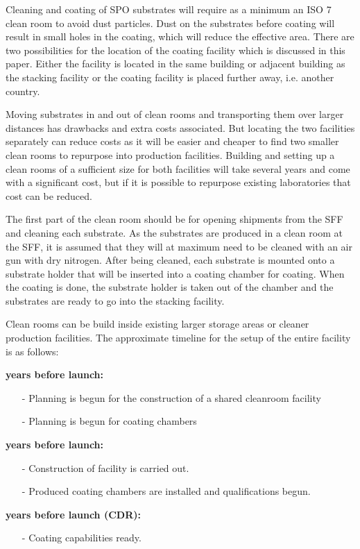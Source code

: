 Cleaning and coating of SPO substrates will require as a minimum an ISO 7 clean room to avoid dust particles. Dust on the substrates before coating will result in small holes in the coating, which will reduce the effective area. There are two possibilities for the location of the coating facility which is discussed in this paper. Either the facility is located in the same building or adjacent building as the stacking facility or the coating facility is placed further away, i.e. another country.

Moving substrates in and out of clean rooms and transporting them over larger distances has drawbacks and extra costs associated. But locating the two facilities separately can reduce costs as it will be easier and cheaper to find two smaller clean rooms to repurpose into production facilities. Building and setting up a clean rooms of a sufficient size for both facilities will take several years and come with a significant cost, but if it is possible to repurpose existing laboratories that cost can be reduced.

The first part of the clean room should be for opening shipments from the SFF and cleaning each substrate. As the substrates are produced in a clean room at the SFF, it is assumed that they will at maximum need to be cleaned with an air gun with dry nitrogen. After being cleaned, each substrate is mounted onto a substrate holder that will be inserted into a coating chamber for coating. When the coating is done, the substrate holder is taken out of the chamber and the substrates are ready to go into the stacking facility.

Clean rooms can be build inside existing larger storage areas or cleaner production facilities. The approximate timeline for the setup of the entire facility is as follows:

\begin{description}[itemsep=1.5pt,parsep=1pt]
	\item[9] \textbf{years before launch:}
		\begin{itemize}[itemsep=1.5pt,parsep=1pt]
		\item[-] Planning is begun for the construction of a shared cleanroom facility
		\item[-] Planning is begun for coating chambers
		\end{itemize}
	\item[7-8] \textbf{years before launch:}
		\begin{itemize}[itemsep=1.5pt,parsep=1pt]
		\item[-] Construction of facility is carried out.
		\item[-] Produced coating chambers are installed and qualifications begun.
		\end{itemize}
	\item[6] \textbf{years before launch (CDR):}
		\begin{itemize}[itemsep=1.5pt,parsep=1pt]
		\item[-] Coating capabilities ready.
		\end{itemize}
\end{description}


